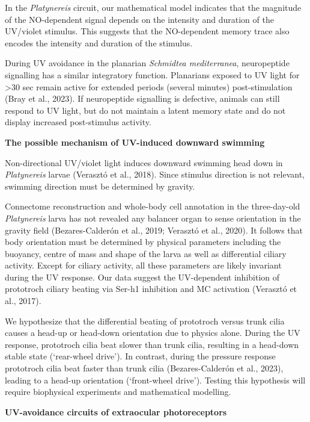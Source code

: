 \documentclass[
  10pt,
  onecolumn]{article}
\begin{document}
In the \emph{Platynereis} circuit, our mathematical model indicates that
the magnitude of the NO-dependent signal depends on the intensity and
duration of the UV/violet stimulus. This suggests that the NO-dependent
memory trace also encodes the intensity and duration of the stimulus.

During UV avoidance in the planarian \emph{Schmidtea mediterranea},
neuropeptide signalling has a similar integratory function. Planarians
exposed to UV light for \textgreater30 sec remain active for extended
periods (several minutes) post-stimulation (Bray et al., 2023). If
neuropeptide signalling is defective, animals can still respond to UV
light, but do not maintain a latent memory state and do not display
increased post-stimulus activity.

\textbf{The possible mechanism of UV-induced downward swimming}

Non-directional UV/violet light induces downward swimming head down in
\emph{Platynereis} larvae (Verasztó et al., 2018). Since stimulus
direction is not relevant, swimming direction must be determined by
gravity.

Connectome reconstruction and whole-body cell annotation in the
three-day-old \emph{Platynereis} larva has not revealed any balancer
organ to sense orientation in the gravity field (Bezares-Calderón et
al., 2019; Verasztó et al., 2020). It follows that body orientation must
be determined by physical parameters including the buoyancy, centre of
mass and shape of the larva as well as differential ciliary activity.
Except for ciliary activity, all these parameters are likely invariant
during the UV response. Our data suggest the UV-dependent inhibition of
prototroch ciliary beating via Ser-h1 inhibition and MC activation
(Verasztó et al., 2017).

We hypothesize that the differential beating of prototroch versus trunk
cilia causes a head-up or head-down orientation due to physics alone.
During the UV response, prototroch cilia beat slower than trunk cilia,
resulting in a head-down stable state (`rear-wheel drive'). In contrast,
during the pressure response prototroch cilia beat faster than trunk
cilia (Bezares-Calderón et al., 2023), leading to a head-up orientation
(`front-wheel drive'). Testing this hypothesis will require biophysical
experiments and mathematical modelling.

\textbf{UV-avoidance circuits of extraocular photoreceptors}
\end{document}
